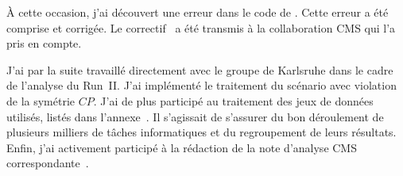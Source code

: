 À cette occasion, j'ai découvert une erreur dans le code de \COMBINE.
Cette erreur a été comprise et corrigée.
Le correctif~\cite{BBB_PR} a été transmis à la collaboration CMS qui l'a pris en compte.
\par
J'ai par la suite travaillé directement avec le groupe de Karlsruhe dans le cadre de l'analyse du Run~II.
J'ai implémenté le traitement du scénario avec violation de la symétrie $CP$.
J'ai de plus participé au traitement des jeux de données utilisés, listés dans l'annexe~.
Il s'agissait de s'assurer du bon déroulement de plusieurs milliers de tâches informatiques et du regroupement de leurs résultats.
Enfin, j'ai activement participé à la rédaction de la note d'analyse CMS correspondante~\cite{CMS-NOTE-2020-218}.
